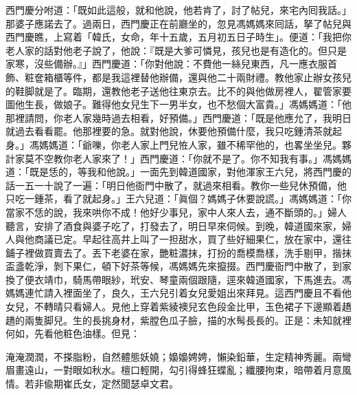 西門慶分咐道：「既如此這般，就和他說，他若肯了，討了帖兒，來宅內囘我話。」那婆子應諾去了。過兩日，西門慶正在前廳坐的，忽見馮媽媽來囘話，拏了帖兒與西門慶瞧，上寫着「韓氏，女命，年十五歲，五月初五日子時生」。便道：「我把你老人家的話對他老子說了，他說：『既是大爹可憐見，孩兒也是有造化的。但只是家寒，沒些備辦。』」西門慶道：「你對他說：不費他一絲兒東西，凡一應衣服首飾、粧奩箱櫃等件，都是我這裡替他辦備，還與他二十兩財禮。教他家止辦女孩兒的鞋脚就是了。臨期，還教他老子送他往東京去。比不的與他做房裡人，翟管家要圖他生長，做娘子。難得他女兒生下一男半女，也不愁個大富貴。」馮媽媽道：「他那裡請問，你老人家幾時過去相看，好預備。」西門慶道：「既是他應允了，我明日就過去看看罷。他那裡要的急。就對他說，休要他預備什麼，我只吃鍾清茶就起身。」馮媽媽道：「爺嚛，你老人家上門兒恠人家，雖不稀罕他的，也畧坐坐兒。夥計家莫不空教你老人家來了！」西門慶道：「你就不是了。你不知我有事。」馮媽媽道：「既是恁的，等我和他說。」一面先到韓道國家，對他渾家王六兒，將西門慶的話一五一十說了一遍：「明日他衙門中散了，就過來相看。教你一些兒休預備，他只吃一鍾茶，看了就起身。」王六兒道：「眞個？媽媽子休要說謊。」馮媽媽道：「你當家{}不恁的說，我來哄你不成！他好少事兒，家中人來人去，通不斷頭的。」婦人聽言，安排了酒食與婆子吃了，打發去了，明日早來伺候。到晚，韓道國來家，婦人與他商議已定。早起往高井上叫了一担甜水，買了些好細果仁，放在家中，還往鋪子裡做買賣去了。丟下老婆在家，{}艷粧濃抹，打扮的喬模喬樣，洗手剔甲，揩抹盃盞乾淨，剝下果仁，頓下好茶等候，馮媽媽先來攛掇。西門慶衙門中散了，到家換了便衣靖巾，騎馬帶眼紗，玳安、琴童兩個跟隨，逕來韓道國家，下馬進去。馮媽媽連忙請入裡面坐了，良久，王六兒引着女兒愛姐出來拜見。這西門慶且不看他女兒，不轉晴只看婦人。見他上穿着紫綾襖兒玄色段金比甲，玉色裙子下邊顯着趫趫的兩隻脚兒。生的長挑身材，紫膛色瓜子臉，描的水髩長長的。{}正是：未知就裡何如，先看他粧色油樣。但見：

\begin{myquote}
淹淹潤潤，不搽脂粉，自然體態妖嬈；嬝嬝娉娉，懶染鉛華，生定精神秀麗。兩彎眉畫遠山，一對眼如秋水。檀口輕開，勾引得蜂狂蝶亂；纖腰拘束，暗帶着月意風情。若非偸期崔氏女，定然聞瑟卓文君。
\end{myquote}

